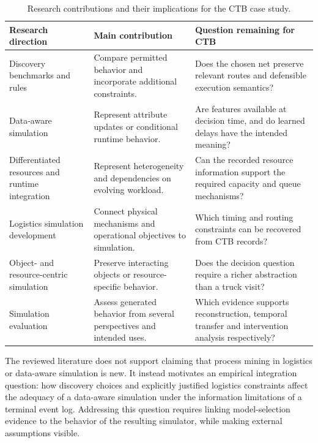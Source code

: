\begin{table}[htbp]
\centering
\begin{tabularx}{\textwidth}{@{}p{}YY@{}}
\hline
Research direction & Main contribution & Question remaining for CTB \\
\hline
Discovery benchmarks and rules~\cite{RWAugusto2019Review,RWNorouzifar2026Rules} & Compare permitted behavior and incorporate additional constraints. & Does the chosen net preserve relevant routes and defensible execution semantics? \\
Data-aware simulation~\cite{lopez2024,Vinci2026prosit} & Represent attribute updates or conditional runtime behavior. & Are features available at decision time, and do learned delays have the intended meaning? \\
Differentiated resources and runtime integration~\cite{BPSdifferentiatedResources2022,runtimeIntegration2024} & Represent heterogeneity and dependencies on evolving workload. & Can the recorded resource information support the required capacity and queue mechanisms? \\
Logistics simulation development~\cite{Grobis2026SimulationDevelopment,Kastner2021} & Connect physical mechanisms and operational objectives to simulation. & Which timing and routing constraints can be recovered from CTB records? \\
Object- and resource-centric simulation~\cite{Knopp2023ObjectCentricSimulation,RWKirchdorfer2025Agents} & Preserve interacting objects or resource-specific behavior. & Does the decision question require a richer abstraction than a truck visit? \\
Simulation evaluation~\cite{Chapela2025SimQuality,Ozdemir2025UtilityBPS} & Assess generated behavior from several perspectives and intended uses. & Which evidence supports reconstruction, temporal transfer and intervention analysis respectively? \\
\hline
\end{tabularx}
\caption{Research contributions and their implications for the CTB case study.}
\label{tab:rw_comparison}
\end{table}

The reviewed literature does not support claiming that process mining in logistics or data-aware simulation is new. It instead motivates an empirical integration question: how discovery choices and explicitly justified logistics constraints affect the adequacy of a data-aware simulation under the information limitations of a terminal event log. Addressing this question requires linking model-selection evidence to the behavior of the resulting simulator, while making external assumptions visible.

